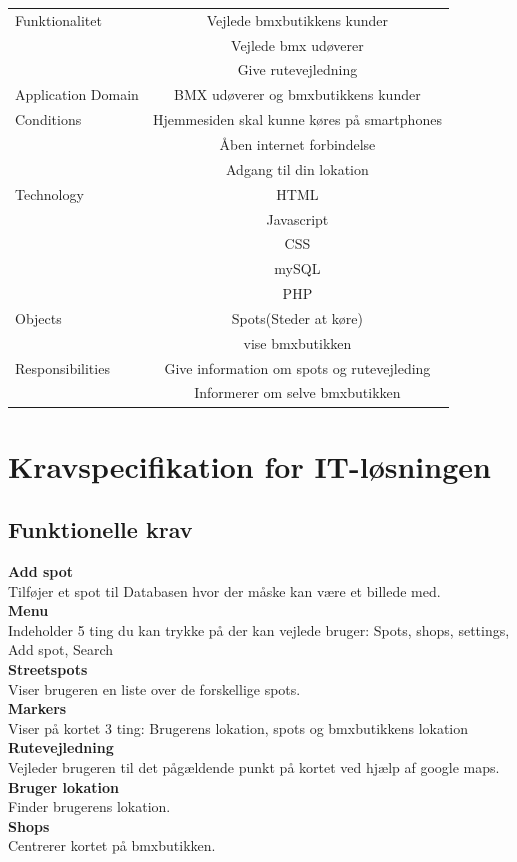 \documentclass[12pt]{article}
\begin{document}
\begin{center}
  \begin{tabular}{| l | c |}
    \hline
    Funktionalitet & Vejlede bmxbutikkens kunder\\ & Vejlede bmx udøverer\\ & Give rutevejledning\\ \hline
    Application Domain & BMX udøverer og bmxbutikkens kunder\\ \hline
    Conditions & Hjemmesiden skal kunne køres på smartphones\\ & Åben internet forbindelse \\ & Adgang til din lokation\\
    \hline
        Technology & HTML \\ & Javascript \\ & CSS\\ & mySQL\\ & PHP\\
    \hline
        Objects & Spots(Steder at køre)\\ & vise bmxbutikken\\
    \hline
        Responsibilities & Give information om spots og rutevejleding \\ & Informerer om selve bmxbutikken\\
    \hline
  \end{tabular}
\end{center}


\pagebreak

\section{Kravspecifikation for IT-løsningen}
\subsection*{Funktionelle krav}
\textbf{Add spot} \\ Tilføjer et spot til Databasen hvor der måske kan være et billede med.\\
\textbf{Menu}\\ Indeholder 5 ting du kan trykke på der kan vejlede bruger: Spots, shops, settings, Add spot, Search\\
\textbf{Streetspots}\\ Viser brugeren en liste over de forskellige spots.\\
\textbf{Markers}\\ Viser på kortet 3 ting: Brugerens lokation, spots og bmxbutikkens lokation\\
\textbf{Rutevejledning}\\ Vejleder brugeren til det pågældende punkt på kortet ved hjælp af google maps.\\
\textbf{Bruger lokation}\\ Finder brugerens lokation.\\
\textbf{Shops}\\ Centrerer kortet på bmxbutikken.
\end{document}
